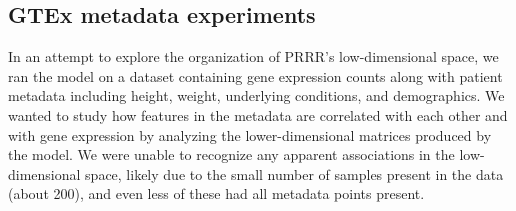 \documentclass{bmcart}
\begin{document}
\subsection{GTEx metadata experiments}
\label{appendix:}
In an attempt to explore the organization of PRRR's low-dimensional space, we ran the model on a dataset containing gene expression counts along with patient metadata including height, weight, underlying conditions, and demographics. We wanted to study how features in the metadata are correlated with each other and with gene expression by analyzing the lower-dimensional matrices produced by the model. We were unable to recognize any apparent associations in the low-dimensional space, likely due to the small number of samples present in the data (about 200), and even less of these had all metadata points present.
\end{document}
